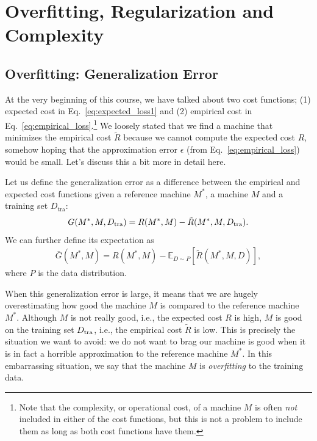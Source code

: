 \documentclass{report}
\newcommand{\tra}{\text{tra}}
\begin{document}
\section{Overfitting, Regularization and Complexity}

\subsection{Overfitting: Generalization Error}

At the very beginning of this course, we have talked about two cost functions;
(1) expected cost in Eq.~\eqref{eq:expected_loss1} and (2) empirical cost in
Eq.~\eqref{eq:empirical_loss}.\footnote{
    Note that the complexity, or operational cost, of a machine $M$ is often
    {\it not} included in either of the cost functions, but this is not a
    problem to include them as long as both cost functions have them. 
} We loosely stated that we find a machine that minimizes the empirical cost
$\tilde{R}$ because we cannot compute the expected cost $R$, somehow hoping that
the approximation error $\epsilon$ (from Eq.~\eqref{eq:empirical_loss}) would be
small. Let's discuss this a bit more in detail here.

Let us define the generalization error as a difference between the empirical and
expected cost functions given a reference machine $M^*$, a machine $M$ and a
training set $D_{\tra}$:
\begin{align}
    \label{eq:generr}
    G(M^*, M, D_{\tra}) = R(M^*, M) - \tilde{R}(M^*, M, D_{\text{\tra}}).
\end{align}
We can further define its expectation as
\begin{align}
    \label{eq:generr_ee}
    \bar{G}(M^*, M) = R(M^*, M) - \mathbb{E}_{D \sim P} \left[\tilde{R}(M^*, M,
    D)\right],
\end{align}
where $P$ is the data distribution. 

When this generalization error is large, it means that we are hugely
overestimating how good the machine $M$ is compared to the reference machine
$M^*$. Although $M$ is not really good, i.e., the expected cost $R$ is high, $M$
is good on the training set $D_{\text{\tra}}$, i.e., the empirical cost
$\tilde{R}$ is low. This is precisely the situation we want to avoid: we do not
want to brag our machine is good when it is in fact a horrible approximation to
the reference machine $M^*$. In this embarrassing situation, we say that the
machine $M$ is {\it overfitting} to the training data.
\end{document}
